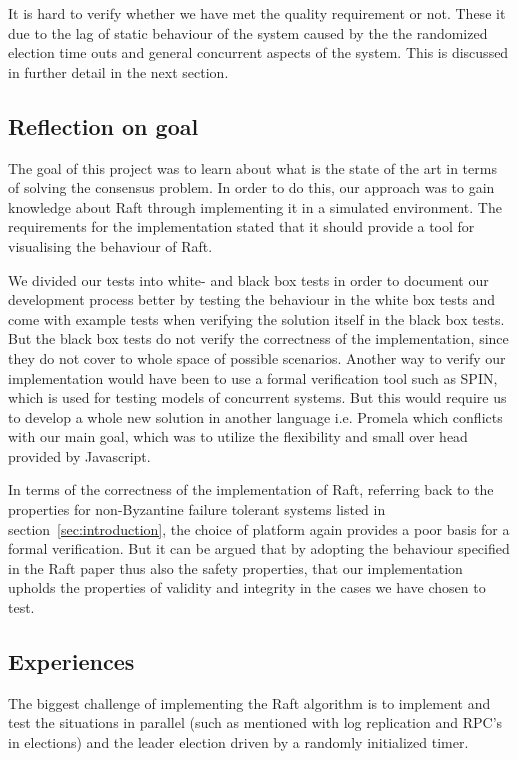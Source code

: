 It is hard to verify whether we have met the quality requirement or not. These it due to the lag of static behaviour of the system caused by the the randomized election time outs and general concurrent aspects of the system. This is discussed in further detail in the next section.

\subsection{Reflection on goal}
The goal of this project was to learn about what is the state of the art in terms of solving the consensus problem. In order to do this, our approach was to gain knowledge about Raft through implementing it in a simulated environment.
The requirements for the implementation stated that it should provide a tool for visualising the behaviour of Raft.

We divided our tests into white- and black box tests in order to document our development process better by testing the behaviour in the white box tests and come with example tests when verifying the solution itself in the black box tests. But the black box tests do not verify the correctness of the implementation, since they do not cover to whole space of possible scenarios. Another way to verify our implementation would have been to use a formal verification tool such as SPIN, which is used for testing models of concurrent systems. But this would require us to develop a whole new solution in another language i.e. Promela which conflicts with our main goal, which was to utilize the flexibility and small over head provided by Javascript.

In terms of the correctness of the implementation of Raft, referring back to the properties for non-Byzantine failure tolerant systems listed in section~\ref{sec:introduction}, the choice of platform again provides a poor basis for a formal verification. But it can be argued that by adopting the behaviour specified in the Raft paper thus also the safety properties, that our implementation upholds the properties of validity and integrity in the cases we have chosen to test.

\subsection{Experiences}

The biggest challenge of implementing the Raft algorithm is to implement and test the situations in parallel (such as mentioned with log replication and RPC's in elections) and the leader election driven by a randomly initialized timer.

